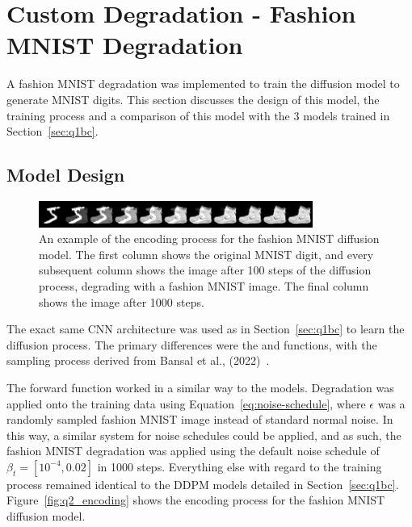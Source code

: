 
\section{Custom Degradation - Fashion MNIST Degradation}\label{sec:q2}
A fashion MNIST degradation was implemented to train the diffusion model to generate MNIST digits.
This section discusses the design of this model, the training process and a comparison of this model with the 3 models
trained in Section~\eqref{sec:q1bc}.

\subsection{Model Design}\label{subsec:model-design}
\begin{figure}[t]
    \centering
    \includegraphics[width=0.8\textwidth]{figures/q2_encoding}
    \caption{An example of the encoding process for the fashion MNIST diffusion model. The first column shows the
        original MNIST digit, and every subsequent column shows the image after 100 steps of the diffusion process,
        degrading with a fashion MNIST image. The final column shows the image after 1000 steps.}
    \label{fig:q2_encoding}
\end{figure}

The exact same CNN architecture was used as in Section~\eqref{sec:q1bc} to learn the diffusion process.
The primary differences were the  and  functions, with the sampling process
derived from Bansal et al., (2022)~\cite{bansal}.

The forward function worked in a similar way to the  models.
Degradation was applied onto the training data using Equation~\eqref{eq:noise-schedule}, where $\epsilon$ was a randomly
sampled fashion MNIST image instead of standard normal noise.
In this way, a similar system for noise schedules could be applied, and as such, the fashion MNIST degradation was
applied using the default noise schedule of $\beta_{t} = [10^{-4}, 0.02]$ in 1000 steps.
Everything else with regard to the training process remained identical to the DDPM models detailed in Section~\eqref{sec:q1bc}.
Figure~\eqref{fig:q2_encoding} shows the encoding process for the fashion MNIST diffusion model.

